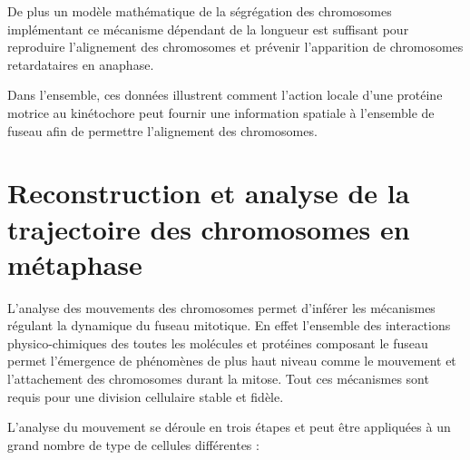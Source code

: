 \documentclass[12pt,a4paper,twoside,openright]{book}
\begin{document}
De plus un modèle mathématique de la ségrégation des chromosomes
implémentant ce mécanisme dépendant de la longueur est suffisant pour
reproduire l'alignement des chromosomes et prévenir l'apparition de
chromosomes retardataires en anaphase.

Dans l'ensemble, ces données illustrent comment l'action locale d'une
protéine motrice au kinétochore peut fournir une information spatiale à
l'ensemble de fuseau afin de permettre l'alignement des chromosomes.





\section{Reconstruction et analyse de la trajectoire des chromosomes en
métaphase}\label{reconstruction-et-analyse-de-la-trajectoire-des-chromosomes-en-muxe9taphase}

L'analyse des mouvements des chromosomes permet d'inférer les mécanismes
régulant la dynamique du fuseau mitotique. En effet l'ensemble des
interactions physico-chimiques des toutes les molécules et protéines
composant le fuseau permet l'émergence de phénomènes de plus haut niveau
comme le mouvement et l'attachement des chromosomes durant la mitose.
Tout ces mécanismes sont requis pour une division cellulaire stable et
fidèle.

L'analyse du mouvement se déroule en trois étapes et peut être
appliquées à un grand nombre de type de cellules différentes :
\end{document}
